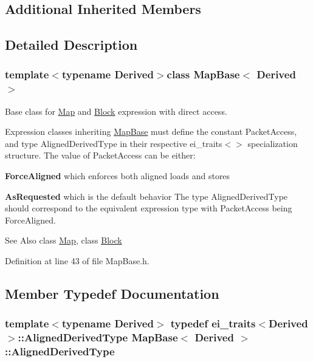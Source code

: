 \subsection*{Additional Inherited Members}


\subsection{Detailed Description}
\subsubsection*{template$<$typename Derived$>$class Map\-Base$<$ Derived $>$}

Base class for \hyperlink{class_map}{Map} and \hyperlink{class_block}{Block} expression with direct access. 

Expression classes inheriting \hyperlink{class_map_base}{Map\-Base} must define the constant {\ttfamily Packet\-Access}, and type {\ttfamily Aligned\-Derived\-Type} in their respective ei\-\_\-traits$<$$>$ specialization structure. The value of {\ttfamily Packet\-Access} can be either\-:
\begin{DoxyItemize}
\item {\bfseries Force\-Aligned} which enforces both aligned loads and stores
\item {\bfseries As\-Requested} which is the default behavior The type {\ttfamily Aligned\-Derived\-Type} should correspond to the equivalent expression type with {\ttfamily Packet\-Access} being {\ttfamily Force\-Aligned}.
\end{DoxyItemize}

\begin{DoxySeeAlso}{See Also}
class \hyperlink{class_map}{Map}, class \hyperlink{class_block}{Block} 
\end{DoxySeeAlso}


Definition at line 43 of file Map\-Base.\-h.



\subsection{Member Typedef Documentation}
\hypertarget{class_map_base_a57c5a3543f137919cfd9aba5aa05005a}{
\subsubsection[{Aligned\-Derived\-Type}]{\setlength{\rightskip}{0pt plus 5cm}template$<$typename Derived$>$ typedef {\bf ei\-\_\-traits}$<$Derived$>$\-::{\bf Aligned\-Derived\-Type} {\bf Map\-Base}$<$ Derived $>$\-::{\bf Aligned\-Derived\-Type}}}\label{class_map_base_a57c5a3543f137919cfd9aba5aa05005a}


